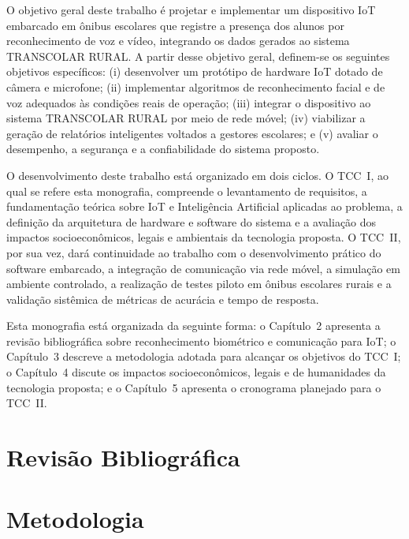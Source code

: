 \documentclass[
    12pt,
    openright,
    twoside,
    a4paper,
    chapter=TITLE,
    section=TITLE,
    english,
    brazil
    ]{abntex2}
\begin{document}
O objetivo geral deste trabalho é projetar e implementar um dispositivo IoT
embarcado em ônibus escolares que registre a presença dos alunos por
reconhecimento de voz e vídeo, integrando os dados gerados ao sistema
TRANSCOLAR RURAL. A partir desse objetivo geral, definem-se os seguintes
objetivos específicos: (i) desenvolver um protótipo de hardware IoT dotado de
câmera e microfone; (ii) implementar algoritmos de reconhecimento facial e de
voz adequados às condições reais de operação; (iii) integrar o dispositivo ao
sistema TRANSCOLAR RURAL por meio de rede móvel; (iv) viabilizar a geração de
relatórios inteligentes voltados a gestores escolares; e (v) avaliar o
desempenho, a segurança e a confiabilidade do sistema proposto.

O desenvolvimento deste trabalho está organizado em dois ciclos. O TCC~I, ao
qual se refere esta monografia, compreende o levantamento de requisitos, a
fundamentação teórica sobre IoT e Inteligência Artificial aplicadas ao
problema, a definição da arquitetura de hardware e software do sistema e a
avaliação dos impactos socioeconômicos, legais e ambientais da tecnologia
proposta. O TCC~II, por sua vez, dará continuidade ao trabalho com o
desenvolvimento prático do software embarcado, a integração de comunicação
via rede móvel, a simulação em ambiente controlado, a realização de testes
piloto em ônibus escolares rurais e a validação sistêmica de métricas de
acurácia e tempo de resposta.

Esta monografia está organizada da seguinte forma: o Capítulo~2 apresenta a
revisão bibliográfica sobre reconhecimento biométrico e comunicação para IoT;
o Capítulo~3 descreve a metodologia adotada para alcançar os objetivos do
TCC~I; o Capítulo~4 discute os impactos socioeconômicos, legais e de
humanidades da tecnologia proposta; e o Capítulo~5 apresenta o cronograma
planejado para o TCC~II.

\chapter{Revisão Bibliográfica}

\chapter{Metodologia}
\end{document}
